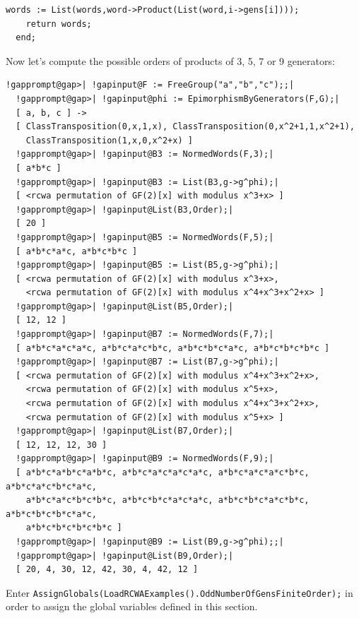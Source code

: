 \documentclass[a4paper,11pt]{report}
\begin{document}
{{\begin{Verbatim}[commandchars=!@|,fontsize=\small,frame=single,label=GAP code]
    words := List(words,word->Product(List(word,i->gens[i])));
    return words;
  end;
\end{Verbatim}
 Now let's compute the possible orders of products of 3, 5, 7 or 9 generators: 
\begin{Verbatim}[commandchars=!@|,fontsize=\small,frame=single,label=Example]
  !gapprompt@gap>| !gapinput@F := FreeGroup("a","b","c");;|
  !gapprompt@gap>| !gapinput@phi := EpimorphismByGenerators(F,G);|
  [ a, b, c ] -> 
  [ ClassTransposition(0,x,1,x), ClassTransposition(0,x^2+1,1,x^2+1), 
    ClassTransposition(1,x,0,x^2+x) ]
  !gapprompt@gap>| !gapinput@B3 := NormedWords(F,3);|
  [ a*b*c ]
  !gapprompt@gap>| !gapinput@B3 := List(B3,g->g^phi);|
  [ <rcwa permutation of GF(2)[x] with modulus x^3+x> ]
  !gapprompt@gap>| !gapinput@List(B3,Order);|
  [ 20 ]
  !gapprompt@gap>| !gapinput@B5 := NormedWords(F,5);|
  [ a*b*c*a*c, a*b*c*b*c ]
  !gapprompt@gap>| !gapinput@B5 := List(B5,g->g^phi);|
  [ <rcwa permutation of GF(2)[x] with modulus x^3+x>, 
    <rcwa permutation of GF(2)[x] with modulus x^4+x^3+x^2+x> ]
  !gapprompt@gap>| !gapinput@List(B5,Order);|
  [ 12, 12 ]
  !gapprompt@gap>| !gapinput@B7 := NormedWords(F,7);|
  [ a*b*c*a*c*a*c, a*b*c*a*c*b*c, a*b*c*b*c*a*c, a*b*c*b*c*b*c ]
  !gapprompt@gap>| !gapinput@B7 := List(B7,g->g^phi);|
  [ <rcwa permutation of GF(2)[x] with modulus x^4+x^3+x^2+x>, 
    <rcwa permutation of GF(2)[x] with modulus x^5+x>, 
    <rcwa permutation of GF(2)[x] with modulus x^4+x^3+x^2+x>, 
    <rcwa permutation of GF(2)[x] with modulus x^5+x> ]
  !gapprompt@gap>| !gapinput@List(B7,Order);|
  [ 12, 12, 12, 30 ]
  !gapprompt@gap>| !gapinput@B9 := NormedWords(F,9);|
  [ a*b*c*a*b*c*a*b*c, a*b*c*a*c*a*c*a*c, a*b*c*a*c*a*c*b*c, a*b*c*a*c*b*c*a*c, 
    a*b*c*a*c*b*c*b*c, a*b*c*b*c*a*c*a*c, a*b*c*b*c*a*c*b*c, a*b*c*b*c*b*c*a*c, 
    a*b*c*b*c*b*c*b*c ]
  !gapprompt@gap>| !gapinput@B9 := List(B9,g->g^phi);;|
  !gapprompt@gap>| !gapinput@List(B9,Order);|
  [ 20, 4, 30, 12, 42, 30, 4, 42, 12 ]
\end{Verbatim}
 Enter \texttt{AssignGlobals(LoadRCWAExamples().OddNumberOfGens{\textunderscore}FiniteOrder);} in order to assign the global variables defined in this section. }

  
}
\end{document}
